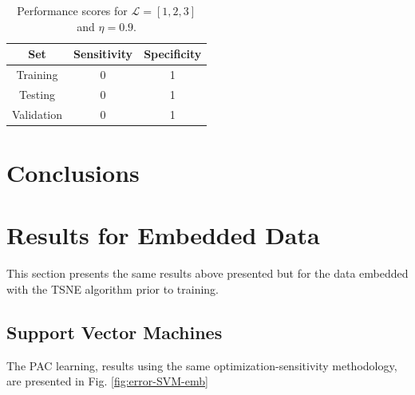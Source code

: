 \documentclass[conference]{IEEEtran}
\theoremstyle{definition}
\theoremstyle{remark}
\theoremstyle{remark}
\begin{document}
\begin{table}
\centering
\caption{Performance scores for $\mathcal{L}=[1,2,3]$ and $\eta=0.9$.}
\label{tab:L123}
\begin{tabular}{ccc}
\hline
\textbf{Set} & \textbf{Sensitivity} & \textbf{Specificity} \\ \hline
Training & 0 & 1 \\
Testing & 0 & 1 \\
Validation & 0 & 1 \\ \hline
\end{tabular}
\end{table}

\section{Conclusions}\label{sec:conc}

\printbibliography

\newpage
\appendices

\section{Results for Embedded Data}
This section presents the same results above presented but for the data
embedded with the TSNE algorithm prior to training.

\subsection{Support Vector Machines}
The PAC learning, results using the same optimization-sensitivity methodology,
are presented in Fig. \ref{fig:error-SVM-emb}
\end{document}
